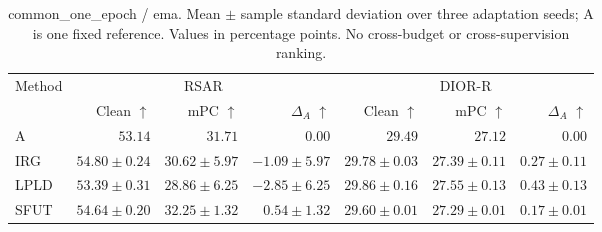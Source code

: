 \begin{table}[t]
\centering
\setlength{\tabcolsep}{4pt}
\renewcommand{\arraystretch}{1.15}
\caption{common\_one\_epoch / ema. Mean $\pm$ sample standard deviation over three adaptation seeds; A is one fixed reference. Values in percentage points. No cross-budget or cross-supervision ranking.}
\begin{tabular}{@{}lrrrrrr@{}}
\toprule
Method & \multicolumn{3}{c}{RSAR} & \multicolumn{3}{c}{DIOR-R} \\
\cmidrule(lr){2-4}\cmidrule(lr){5-7}
 & Clean $\uparrow$ & mPC $\uparrow$ & $\Delta_A$ $\uparrow$ & Clean $\uparrow$ & mPC $\uparrow$ & $\Delta_A$ $\uparrow$ \\
\midrule
A & $53.14$ & $31.71$ & $0.00$ & $29.49$ & $27.12$ & $0.00$ \\
IRG & $54.80 \pm 0.24$ & $30.62 \pm 5.97$ & $-1.09 \pm 5.97$ & $29.78 \pm 0.03$ & $27.39 \pm 0.11$ & $0.27 \pm 0.11$ \\
LPLD & $53.39 \pm 0.31$ & $28.86 \pm 6.25$ & $-2.85 \pm 6.25$ & $29.86 \pm 0.16$ & $27.55 \pm 0.13$ & $0.43 \pm 0.13$ \\
SFUT & $54.64 \pm 0.20$ & $32.25 \pm 1.32$ & $0.54 \pm 1.32$ & $29.60 \pm 0.01$ & $27.29 \pm 0.01$ & $0.17 \pm 0.01$ \\
\bottomrule
\end{tabular}
\end{table}
